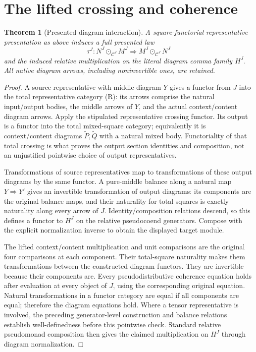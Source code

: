 \documentclass[11pt]{article}
\newtheorem{theorem}{Theorem}\newtheorem{lemma}{Lemma}
\begin{document}
\section{The lifted crossing and coherence}
\begin{theorem}[Presented diagram interaction]
A square-functorial representative presentation as above induces a full presented law
\[
 \tau^J:N^J\odot_{\mathcal C^J}M^J\Longrightarrow M^J\odot_{\mathcal C^J}N^J
\]
and the induced relative multiplication on the literal diagram comma family $H^J$. All native diagram arrows, including noninvertible ones, are retained.
\end{theorem}
\begin{proof}
A source representative with middle diagram $Y$ gives a functor from $J$ into the total representative category (R): its arrows comprise the natural input/output bodies, the middle arrows of $Y$, and the actual context/content diagram arrows. Apply the stipulated representative crossing functor. Its output is a functor into the total mixed-square category; equivalently it is context/content diagrams $\widetilde P,\widetilde Q$ with a natural mixed body. Functoriality of that total crossing is what proves the output section identities and composition, not an unjustified pointwise choice of output representatives.

Transformations of source representatives map to transformations of these output diagrams by the same functor. A pure-middle balance along a natural map $Y\Rightarrow Y'$ gives an invertible transformation of output diagrams: its components are the original balance maps, and their naturality for total squares is exactly naturality along every arrow of $J$. Identity/composition relations descend, so this defines a functor to $H^J$ on the relative pseudocoend generators. Compose with the explicit normalization inverse to obtain the displayed target module.

The lifted context/content multiplication and unit comparisons are the original four comparisons at each component. Their total-square naturality makes them transformations between the constructed diagram functors. They are invertible because their components are. Every pseudodistributive coherence equation holds after evaluation at every object of $J$, using the corresponding original equation. Natural transformations in a functor category are equal if all components are equal; therefore the diagram equations hold. Where a tensor representative is involved, the preceding generator-level construction and balance relations establish well-definedness before this pointwise check. Standard relative pseudomonad composition then gives the claimed multiplication on $H^J$ through diagram normalization.
\end{proof}
\end{document}
